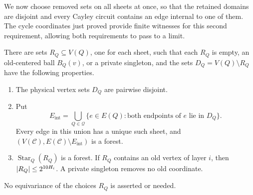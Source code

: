 We now choose removed sets on all sheets at once, so that the retained
domains are disjoint and every Cayley circuit contains an edge internal to
one of them.  The cycle coordinates just proved provide finite witnesses
for this second requirement, allowing both requirements to pass to a limit.

\begin{proposition}
\label{prop:domains}
There are sets $R_Q\subseteq V(Q)$, one for each sheet, such that each
$R_Q$ is empty, an old-centered ball $B_Q(v)$, or a private singleton,
and the sets $D_Q=V(Q)\setminus R_Q$ have the following properties.
\begin{enumerate}
 \item The physical vertex sets $D_Q$ are pairwise disjoint.
 \item Put
 \[
 E_{\mathrm{int}}=
 \bigcup_{Q\in\mathcal Q}
 \{e\in E(Q):\text{both endpoints of }e\text{ lie in }D_Q\}.
 \]
 Every edge in this union has a unique such sheet, and
 $(V(\mathcal C),E(\mathcal C)\setminus E_{\mathrm{int}})$ is a forest.
 \item $\operatorname{Star}_Q(R_Q)$ is a forest.  If $R_Q$ contains an
 old vertex of layer $i$, then $\left\lvert R_Q\right\rvert\leq2^{10H_i}$.  A private
 singleton removes no old coordinate.
\end{enumerate}
No equivariance of the choices $R_Q$ is asserted or needed.
\end{proposition}

